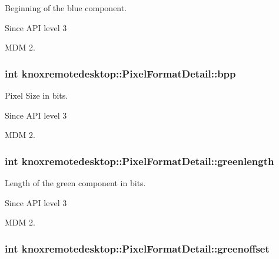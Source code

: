 \-Beginning of the blue component. 

\begin{DoxySince}{\-Since}
\-A\-P\-I level 3

\-M\-D\-M 2. 
\end{DoxySince}
\hypertarget{structknoxremotedesktop_1_1PixelFormatDetail_a9557bebcc969ba20502ba9d377e085dc}{
\subsubsection[{bpp}]{\setlength{\rightskip}{0pt plus 5cm}int {\bf knoxremotedesktop\-::\-Pixel\-Format\-Detail\-::bpp}}}\label{structknoxremotedesktop_1_1PixelFormatDetail_a9557bebcc969ba20502ba9d377e085dc}


\-Pixel \-Size in bits. 

\begin{DoxySince}{\-Since}
\-A\-P\-I level 3

\-M\-D\-M 2. 
\end{DoxySince}
\hypertarget{structknoxremotedesktop_1_1PixelFormatDetail_a87f98032962d81ee015a6a0c56ec6290}{
\subsubsection[{greenlength}]{\setlength{\rightskip}{0pt plus 5cm}int {\bf knoxremotedesktop\-::\-Pixel\-Format\-Detail\-::greenlength}}}\label{structknoxremotedesktop_1_1PixelFormatDetail_a87f98032962d81ee015a6a0c56ec6290}


\-Length of the green component in bits. 

\begin{DoxySince}{\-Since}
\-A\-P\-I level 3

\-M\-D\-M 2. 
\end{DoxySince}
\hypertarget{structknoxremotedesktop_1_1PixelFormatDetail_ab334f70ccc320d17dc86a28730954964}{
\subsubsection[{greenoffset}]{\setlength{\rightskip}{0pt plus 5cm}int {\bf knoxremotedesktop\-::\-Pixel\-Format\-Detail\-::greenoffset}}}\label{structknoxremotedesktop_1_1PixelFormatDetail_ab334f70ccc320d17dc86a28730954964}


